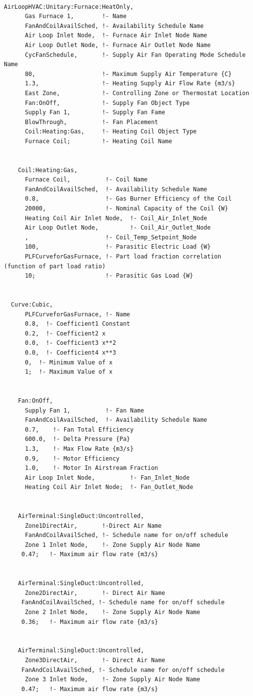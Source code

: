 \begin{lstlisting}

AirLoopHVAC:Unitary:Furnace:HeatOnly,
      Gas Furnace 1,        !- Name
      FanAndCoilAvailSched, !- Availability Schedule Name
      Air Loop Inlet Node,  !- Furnace Air Inlet Node Name
      Air Loop Outlet Node, !- Furnace Air Outlet Node Name
      CycFanSchedule,       !- Supply Air Fan Operating Mode Schedule Name
      80,                   !- Maximum Supply Air Temperature {C}
      1.3,                  !- Heating Supply Air Flow Rate {m3/s}
      East Zone,            !- Controlling Zone or Thermostat Location
      Fan:OnOff,            !- Supply Fan Object Type
      Supply Fan 1,         !- Supply Fan Fame
      BlowThrough,          !- Fan Placement
      Coil:Heating:Gas,     !- Heating Coil Object Type
      Furnace Coil;         !- Heating Coil Name


    Coil:Heating:Gas,
      Furnace Coil,          !- Coil Name
      FanAndCoilAvailSched,  !- Availability Schedule Name
      0.8,                   !- Gas Burner Efficiency of the Coil
      20000,                 !- Nominal Capacity of the Coil {W}
      Heating Coil Air Inlet Node,  !- Coil_Air_Inlet_Node
      Air Loop Outlet Node,         !- Coil_Air_Outlet_Node
      ,                      !- Coil_Temp_Setpoint_Node
      100,                   !- Parasitic Electric Load {W}
      PLFCurveforGasFurnace, !- Part load fraction correlation (function of part load ratio)
      10;                    !- Parasitic Gas Load {W}


  Curve:Cubic,
      PLFCurveforGasFurnace, !- Name
      0.8,  !- Coefficient1 Constant
      0.2,  !- Coefficient2 x
      0.0,  !- Coefficient3 x**2
      0.0,  !- Coefficient4 x**3
      0,  !- Minimum Value of x
      1;  !- Maximum Value of x


    Fan:OnOff,
      Supply Fan 1,          !- Fan Name
      FanAndCoilAvailSched,  !- Availability Schedule Name
      0.7,    !- Fan Total Efficiency
      600.0,  !- Delta Pressure {Pa}
      1.3,    !- Max Flow Rate {m3/s}
      0.9,    !- Motor Efficiency
      1.0,    !- Motor In Airstream Fraction
      Air Loop Inlet Node,          !- Fan_Inlet_Node
      Heating Coil Air Inlet Node;  !- Fan_Outlet_Node


    AirTerminal:SingleDuct:Uncontrolled,
      Zone1DirectAir,       !-Direct Air Name
      FanAndCoilAvailSched, !- Schedule name for on/off schedule
      Zone 1 Inlet Node,    !- Zone Supply Air Node Name
     0.47;   !- Maximum air flow rate {m3/s}


    AirTerminal:SingleDuct:Uncontrolled,
      Zone2DirectAir,       !- Direct Air Name
     FanAndCoilAvailSched, !- Schedule name for on/off schedule
      Zone 2 Inlet Node,    !- Zone Supply Air Node Name
     0.36;   !- Maximum air flow rate {m3/s}


    AirTerminal:SingleDuct:Uncontrolled,
      Zone3DirectAir,       !- Direct Air Name
     FanAndCoilAvailSched, !- Schedule name for on/off schedule
      Zone 3 Inlet Node,    !- Zone Supply Air Node Name
     0.47;   !- Maximum air flow rate {m3/s}
\end{lstlisting}

